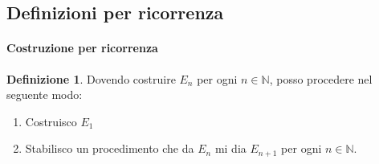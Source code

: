 \documentclass{article}
\theoremstyle{plain}
\theoremstyle{definition}
\newtheorem{defn}{Definizione}[section]
\theoremstyle{remark}
\begin{document}
\vspace{10pt}

\subsection{Definizioni per ricorrenza}

\vspace{10pt}

\paragraph{Costruzione per ricorrenza}
\begin{bxthm}
\begin{defn}
    Dovendo costruire $E_n$ per ogni $n\in\mathbb{N}$, posso procedere nel seguente modo:
    \begin{enumerate}
        \item Costruisco $E_1$
        \item Stabilisco un procedimento che da $E_n$ mi dia $E_{n+1}$ per ogni $n\in\mathbb{N}$.
    \end{enumerate}
\end{defn}
\end{bxthm}

\vspace{10pt}
\end{document}
